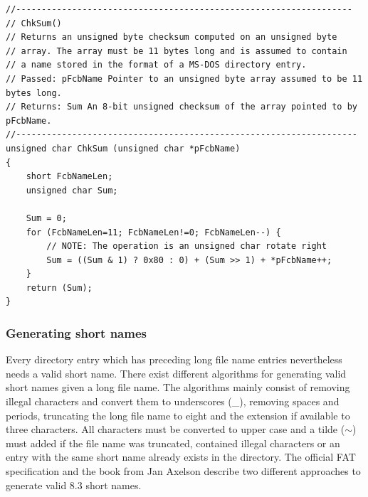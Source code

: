 \lstset{language=c}
\begin{lstlisting}[caption=Calculation of short name checksum \cite{fatgen103}, label=listing:fat_checksum]
//------------------------------------------------------------------
// ChkSum()
// Returns an unsigned byte checksum computed on an unsigned byte
// array. The array must be 11 bytes long and is assumed to contain
// a name stored in the format of a MS-DOS directory entry.
// Passed: pFcbName Pointer to an unsigned byte array assumed to be 11 bytes long.
// Returns: Sum An 8-bit unsigned checksum of the array pointed to by pFcbName.
//-------------------------------------------------------------------
unsigned char ChkSum (unsigned char *pFcbName)
{
    short FcbNameLen;
    unsigned char Sum;
    
    Sum = 0;
    for (FcbNameLen=11; FcbNameLen!=0; FcbNameLen--) {
        // NOTE: The operation is an unsigned char rotate right
        Sum = ((Sum & 1) ? 0x80 : 0) + (Sum >> 1) + *pFcbName++;
    }
    return (Sum);
}
\end{lstlisting}

\subsubsection{Generating short names}

Every directory entry which has preceding long file name entries nevertheless needs a valid short name. There exist different algorithms for generating valid short names given a long file name. The algorithms mainly consist of removing illegal characters and convert them to underscores (\_), removing spaces and periods, truncating the long file name to eight and the extension if available to three characters. All characters must be converted to upper case and a tilde ($\sim$) must added if the file name was truncated, contained illegal characters or an entry with the same short name already exists in the directory. The official FAT specification\cite{fatgen103} and the book from Jan Axelson\cite{usb_ms_jan} describe two different approaches to generate valid 8.3 short names.